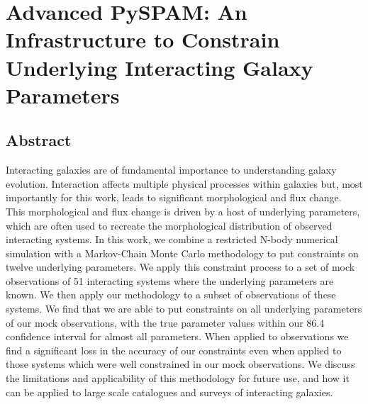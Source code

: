 \chapter{Advanced PySPAM: An Infrastructure to Constrain Underlying Interacting Galaxy Parameters}\label{chapter4}
\section{Abstract}
    Interacting galaxies are of fundamental importance to understanding galaxy evolution. Interaction affects multiple physical processes within galaxies but, most importantly for this work, leads to significant morphological and flux change. This morphological and flux change is driven by a host of underlying parameters, which are often used to recreate the morphological distribution of observed interacting systems. In this work, we combine a restricted N-body numerical simulation with a Markov-Chain Monte Carlo methodology to put constraints on twelve underlying parameters. We apply this constraint process to a set of mock observations of 51 interacting systems where the underlying parameters are known. We then apply our methodology to a subset of observations of these systems. We find that we are able to put constraints on all underlying parameters of our mock observations, with the true parameter values within our 86.4 confidence interval for almost all parameters. When applied to observations we find a significant loss in the accuracy of our constraints even when applied to those systems which were well constrained in our mock observations. We discuss the limitations and applicability of this methodology for future use, and how it can be applied to large scale catalogues and surveys of interacting galaxies.

